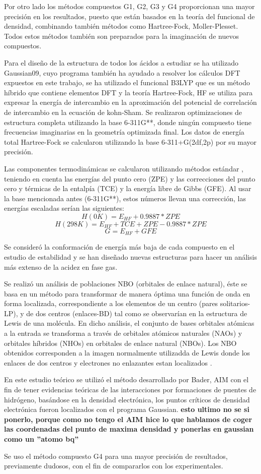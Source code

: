 Por otro lado los métodos compuestos G1, G2, G3 y G4 proporcionan una mayor precisión en los resultados, puesto que están basados en la teoría del funcional de densidad, combinando también métodos como Hartree-Fock, Moller-Plesset.
Todos estos métodos también son preparados para la imaginación de nuevos compuestos.

Para el diseño de la estructura de todos los ácidos a estudiar se ha utilizado Gaussian09, cuyo programa también ha ayudado a resolver los cálculos DFT expuestos en este trabajo, se ha utilizado el funcional B3LYP que es un método híbrido que contiene elementos DFT y la teoría Hartree-Fock, HF se utiliza para expresar la energía de intercambio en la aproximación del potencial de correlación de intercambio en la ecuación de kohn-Sham. Se realizaron optimizaciones de estructura completa utilizando la base 6-311G**, donde ningún compuesto tiene frecuencias imaginarias en la geometría optimizada final. Los datos de energía total Hartree-Fock se calcularon utilizando la base 6-311+G(2df,2p) por su mayor precisión.


Las componentes termodinámicas se calcularon utilizando métodos estándar \cite {quimica4}, teniendo en cuenta las energías del punto cero (ZPE) y las correcciones del punto cero y térmicas de la entalpía (TCE) y la energía libre de Gibbs (GFE). Al usar la base mencionada antes (6-311G**), estos números llevan una corrección, las energías escaladas serían las siguientes: \\
$$ H (0K) = E_{HF} + 0.9887*ZPE $$ 
$$ H (298K) = E_{HF} + TCE + ZPE - 0.9887*ZPE $$ 
$$G = E_{HF} + GFE $$

Se consideró la conformación de energía más baja de cada compuesto en el estudio de estabilidad y se han diseñado nuevas estructuras para hacer un análisis más extenso de la acidez en fase gas.

Se realizó un análisis de poblaciones NBO (orbitales de enlace natural), éste se basa en un método para transformar de manera óptima una función de onda en forma localizada, correspondiente a los elementos de un centro (pares solitarios-LP), y de dos centros (enlaces-BD) tal como se observarían en la estructura de Lewis de una molécula. En dicho análisis, el conjunto de bases orbitales atómicas a la entrada se transforma a través de orbitales atómicos naturales (NAOs) y orbitales híbridos (NHOs) en orbitales de enlace natural (NBOs). Los NBO obtenidos corresponden a la imagen normalmente utilizadda de Lewis donde los enlaces de dos centros y electrones no enlazantes estan localizados \cite{quimica5}.

En este estudio teórico se utilizó el método desarrollado por Bader, AIM \cite{quimica6} con el fin de tener evidencias teóricas de las interacciones por formaciones de puentes de hidrógeno, basándose en la densidad electrónica, los puntos críticos de densidad electrónica fueron localizados con el programa Gaussian. {\bfseries esto ultimo no se si ponerlo, porque como no tengo el AIM hice lo que hablamos de coger las coordenadas del punto de maxima densidad y ponerlas en gaussian como un ''atomo bq''}

Se uso el método compuesto G4 para una mayor precisión de resultados, previamente dudosos, con el fin de compararlos con los experimentales.
 